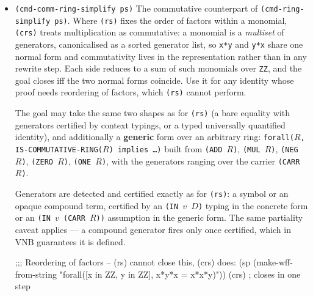 \begin{itemize}
\begin{VNBcode}
;;; After (di), a compound term certified in context becomes a generator:
(sp (make-wff-from-string
  "forall([x in ZZ], (f(x) in ZZ) implies 3 + f(x) = 1 + f(x) + 2)"))
(di) (di) (rs)    ; di peels the forall then the hypothesis; rs then closes

;;; Coefficient arithmetic:
(sp (make-wff-from-string "forall([x in ZZ], 2*x + 3*x = 5*x)"))
(rs)
  \end{VNBcode}

  The primitive inference is \texttt{pi-ring-simplify!}, in
  \texttt{structure-library/ring-simplify.scm}; it normalizes each side to a
  canonical sum-of-monomials polynomial (\texttt{vnb->poly}) and compares.  The interactive short form is \texttt{(rs)}.

\item \texttt{(cmd-comm-ring-simplify ps)}
  The commutative counterpart of \texttt{(cmd-ring-simplify ps)}.  Where
  \texttt{(rs)} fixes the order of factors within a monomial,
  \texttt{(crs)} treats multiplication as commutative: a monomial is a
  \emph{multiset} of generators, canonicalised as a sorted generator
  list, so \texttt{x*y} and \texttt{y*x} share one normal form and
  commutativity lives in the representation rather than in any rewrite
  step.  Each side reduces to a sum of such monomials over \texttt{ZZ},
  and the goal closes iff the two normal forms coincide.  Use it for any
  identity whose proof needs reordering of factors, which \texttt{(rs)}
  cannot perform.

  The goal may take the same two shapes as for \texttt{(rs)} (a bare
  equality with generators certified by context typings, or a typed
  universally quantified identity), and additionally a \textbf{generic}
  form over an arbitrary ring: \texttt{forall($R$, IS-COMMUTATIVE-RING($R$)
  implies \ldots)} built from \texttt{(ADD $R$)}, \texttt{(MUL $R$)},
  \texttt{(NEG $R$)}, \texttt{(ZERO $R$)}, \texttt{(ONE $R$)}, with the
  generators ranging over the carrier \texttt{(CARR $R$)}.

  Generators are detected and certified exactly as for \texttt{(rs)}: a
  symbol or an opaque compound term, certified by an \texttt{(IN $v$ $D$)}
  typing in the concrete form or an \texttt{(IN $v$ (CARR $R$))} assumption in
  the generic form.  The same partiality caveat applies --- a compound
  generator fires only once certified, which in VNB guarantees it is
  defined.

  \begin{VNBcode}
;;; Reordering of factors -- (rs) cannot close this, (crs) does:
(sp (make-wff-from-string
  "forall([x in ZZ, y in ZZ], x*y*x = x*x*y)"))
(crs)   ; closes in one step


\end{VNBcode}
\end{itemize}
